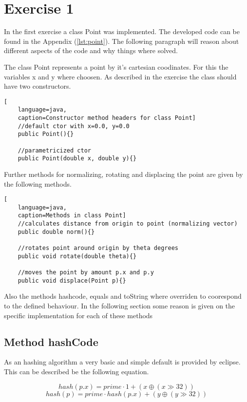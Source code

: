 \chapter{Exercise 1}

In the first exercise a class Point was implemented. The developed code can be found in the Appendix (\ref{lst:point}). The following paragraph will reason about different aspects of the code and why things where solved.

The class Point represents a point by it's cartesian coodinates. For this the variables x and y where choosen. As described in the exercise the class should have two constructors.

\begin{lstlisting}[
    language=java,
    caption=Constructor method headers for class Point]
    //default ctor with x=0.0, y=0.0
    public Point(){}

    //parametricized ctor
    public Point(double x, double y){}
\end{lstlisting}

Further methods for normalizing, rotating and displacing the point are given by the following methods.

\begin{lstlisting}[
    language=java,
    caption=Methods in class Point]
    //calculates distance from origin to point (normalizing vector)
    public double norm(){}

    //rotates point around origin by theta degrees
    public void rotate(double theta){}

    //moves the point by amount p.x and p.y
    public void displace(Point p){}
\end{lstlisting}

Also the methods hashcode, equals and toString where overriden to coorespond to the defined behaviour. In the following section some reason is given on the specific implementation for each of these methods

\section{Method hashCode}
As an hashing algorithm a very basic and simple default is provided by eclipse. This can be described be the following equation.

\begin{displaymath}
    hash(p.x) = prime \cdot 1 + (x \oplus (x \gg 32))
\end{displaymath}
\begin{displaymath}
    hash(p) = prime \cdot hash(p.x) + (y \oplus (y \gg 32))
\end{displaymath}

